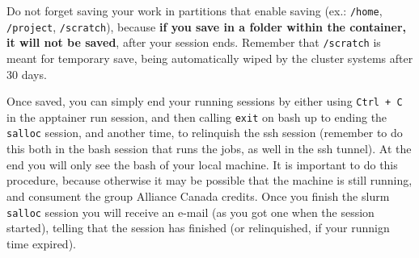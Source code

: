 \documentclass[
]{book}
\begin{document}
Do not forget saving your work in partitions that enable saving (ex.: \texttt{/home}, \texttt{/project}, \texttt{/scratch}), because \textbf{if you save in a folder within the container, it will not be saved}, after your session ends. Remember that \texttt{/scratch} is meant for temporary save, being automatically wiped by the cluster systems after 30 days.

Once saved, you can simply end your running sessions by either using \texttt{Ctrl\ +\ C} in the apptainer run session, and then calling \texttt{exit} on bash up to ending the \texttt{salloc} session, and another time, to relinquish the ssh session (remember to do this both in the bash session that runs the jobs, as well in the ssh tunnel). At the end you will only see the bash of your local machine. It is important to do this procedure, because otherwise it may be possible that the machine is still running, and consument the group Alliance Canada credits. Once you finish the slurm \texttt{salloc} session you will receive an e-mail (as you got one when the session started), telling that the session has finished (or relinquished, if your runnign time expired).

  
\end{document}
